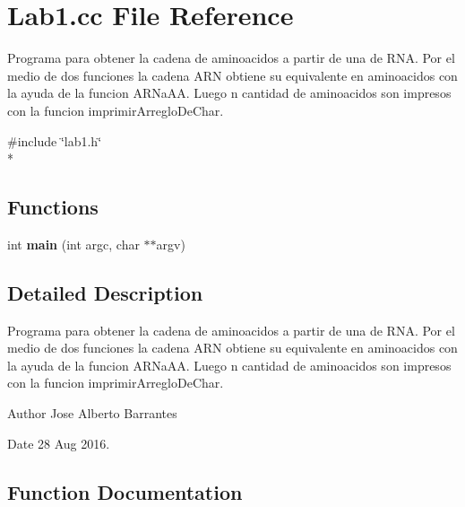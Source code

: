 \section{Lab1.\+cc File Reference}
\label{_lab1_8cc}


Programa para obtener la cadena de aminoacidos a partir de una de R\+NA. Por el medio de dos funciones la cadena A\+RN obtiene su equivalente en aminoacidos con la ayuda de la funcion A\+R\+Na\+AA. Luego n cantidad de aminoacidos son impresos con la funcion imprimir\+Arreglo\+De\+Char.  


{\ttfamily \#include \char`\"{}lab1.\+h\char`\"{}}\\*
\subsection*{Functions}
\begin{DoxyCompactItemize}
\item 
int {\bf main} (int argc, char $\ast$$\ast$argv)
\end{DoxyCompactItemize}


\subsection{Detailed Description}
Programa para obtener la cadena de aminoacidos a partir de una de R\+NA. Por el medio de dos funciones la cadena A\+RN obtiene su equivalente en aminoacidos con la ayuda de la funcion A\+R\+Na\+AA. Luego n cantidad de aminoacidos son impresos con la funcion imprimir\+Arreglo\+De\+Char. 

\begin{DoxyAuthor}{Author}
Jose Alberto Barrantes 
\end{DoxyAuthor}
\begin{DoxyDate}{Date}
28 Aug 2016. 
\end{DoxyDate}


\subsection{Function Documentation}
